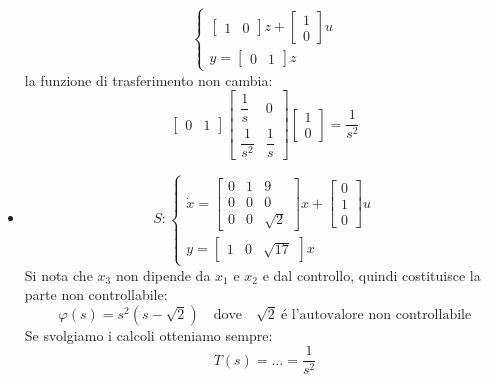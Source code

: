 \documentclass[../main.tex]{subfiles}
\begin{document}
\begin{mdframed}[style=Esempio]
\begin{itemize}
\[\begin{cases}
\begin{bmatrix}
							1 & 0
						\end{bmatrix} z+
						\begin{bmatrix}
							1\\
							0
						\end{bmatrix} u
						\\[1em]
						y =
						\begin{bmatrix}
							0 & 1
						\end{bmatrix} z
						\end{cases}
					\]
					la funzione di trasferimento non cambia:
					\[
						\begin{bmatrix}
							0 & 1
						\end{bmatrix}
						\begin{bmatrix}
							\dfrac{1}{s} & 0
							\\[1em]
							\dfrac{1}{s^2} & \dfrac{1}{s}
						\end{bmatrix}
						\begin{bmatrix}
							1\\
							0
						\end{bmatrix} = \dfrac{1}{s^2}
					\]
				\item 
					\[
						S:
						\begin{cases}
							\dot x =
							\begin{bmatrix}
								0 & 1 & 9\\
								0 & 0 & 0\\
								0 & 0 & \sqrt{2}
							\end{bmatrix} x+
							\begin{bmatrix}
								0\\
								1\\
								0
							\end{bmatrix} u
							\\[1em]
							y =
							\begin{bmatrix}
								1 & 0 & \sqrt{17}
							\end{bmatrix} x
						\end{cases}
					\]
					Si nota che $ x_3 $ non dipende da $ x_1 $ e $ x_2 $ e dal controllo, quindi costituisce la parte non controllabile:
					\[
						\varphi(s) = s^2(s-\sqrt{2}) \quad\text{dove}\quad \sqrt{2} \ \text{\'e l'autovalore non controllabile}
					\]
					Se svolgiamo i calcoli otteniamo sempre:
					\[
						T(s) = \dots = \dfrac{1}{s^2}
					\]
			\end{itemize}
		\end{mdframed}
\end{document}
